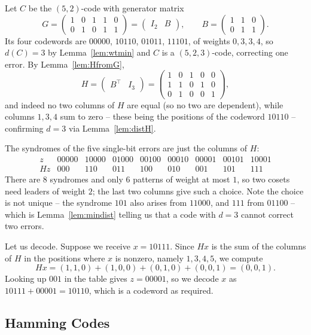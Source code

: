 \begin{example}\label{ex:syndrome523}
	Let $C$ be the $(5,2)$-code with generator matrix
	$$G = \begin{pmatrix} 1&0&1&1&0\\0&1&0&1&1\end{pmatrix} = \begin{pmatrix} I_2 & B \end{pmatrix}, \qquad B = \begin{pmatrix}1&1&0\\0&1&1\end{pmatrix}.$$
	Its four codewords are $00000$, $10110$, $01011$, $11101$, of weights $0,3,3,4$, so $d(C)=3$ by Lemma~\ref{lem:wtmin} and $C$ is a $(5,2,3)$-code, correcting one error. By Lemma~\ref{lem:HfromG},
	$$H = \begin{pmatrix} B^\top & I_3\end{pmatrix} = \begin{pmatrix} 1&0&1&0&0\\1&1&0&1&0\\0&1&0&0&1\end{pmatrix},$$
	and indeed no two columns of $H$ are equal (so no two are dependent), while columns $1,3,4$ sum to zero -- these being the positions of the codeword $10110$ -- confirming $d = 3$ via Lemma~\ref{lem:distH}.

	The syndromes of the five single-bit errors are just the columns of $H$:
	$$\begin{array}{c|cccccccc}
		z & 00000 & 10000 & 01000 & 00100 & 00010 & 00001 & 00101 & 10001\\\hline
		Hz & 000 & 110 & 011 & 100 & 010 & 001 & 101 & 111
	\end{array}$$
	There are $8$ syndromes and only $6$ patterns of weight at most $1$, so two cosets need leaders of weight $2$; the last two columns give such a choice. Note the choice is not unique -- the syndrome $101$ also arises from $11000$, and $111$ from $01100$ -- which is Lemma~\ref{lem:mindist} telling us that a code with $d = 3$ cannot correct two errors.

	Let us decode. Suppose we receive $x = 10111$. Since $Hx$ is the sum of the columns of $H$ in the positions where $x$ is nonzero, namely $1,3,4,5$, we compute
	$$Hx = (1,1,0)+(1,0,0)+(0,1,0)+(0,0,1) = (0,0,1).$$
	Looking up $001$ in the table gives $z = 00001$, so we decode $x$ as $10111+00001 = 10110$, which is a codeword as required.
\end{example}

\subsection{Hamming Codes}


